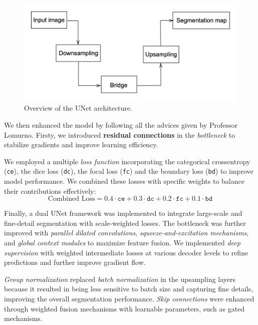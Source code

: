 \documentclass[11pt]{article}
\begin{document}
\begin{multicols*}{2}
    \begin{figure}[H]
    \centering
    \includegraphics[width=0.9\linewidth]{figures/U.png}
    \caption{Overview of the UNet architecture.}
    \label{fig:U}
    \end{figure}
    
    \noindent We then enhanced the model by following all the advices given by Professor Lomurno. Firsty, we  introduced \textbf{residual connections} in the \emph{bottleneck} to stabilize gradients and improve learning efficiency.

    We employed a multiple \textit{loss function} incorporating the categorical crossentropy (\texttt{ce}), the dice loss (\texttt{dc}), the focal loss (\texttt{fc}) and the boundary loss (\texttt{bd}) to improve model performance. We combined these losses with specific weights to balance their contributions effectively:
    \begin{equation*}
    \text{Combined Loss} = 0.4 \cdot \texttt{ce} + 0.3 \cdot \texttt{dc} + 0.2 \cdot \texttt{fc} + 0.1 \cdot \texttt{bd}
    \end{equation*}

\noindent Finally, a dual UNet framework was implemented to integrate large-scale and fine-detail segmentation with scale-weighted losses. The bottleneck was further improved with \emph{parallel dilated convolutions}, \emph{squeeze-and-excitation mechanisms}, and \emph{global context modules} to maximize feature fusion. We implemented \emph{deep supervision} with weighted intermediate losses at various decoder levels to refine predictions and further improve gradient flow. 

\emph{Group normalization} replaced \emph{batch normalization} in the upsampling layers because it resulted in being less sensitive to batch size and capturing fine details, improving the overall segmentation performance. \emph{Skip connections} were enhanced through weighted fusion mechanisms with learnable parameters, such as gated mechanisms. 


\end{multicols*}
\end{document}
